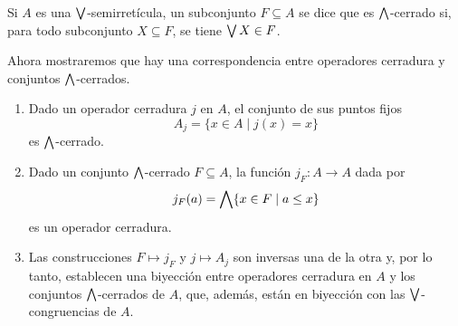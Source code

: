 \begin{definition}
    Si $A$ es una $\bigvee$-semirretícula,
    un subconjunto $F\subseteq A$ se dice que es $\bigwedge$-cerrado si,
    para todo subconjunto $X\subseteq F$, se tiene $\bigvee X\in F$.
\end{definition}

Ahora mostraremos que hay una correspondencia entre operadores
cerradura y conjuntos $\bigwedge$-cerrados.

\begin{lemma}\label{lemma:cerraduras-y-conjuntosfijos}
  \leavevmode
  \begin{enumerate}
    \item
    Dado un operador cerradura $j$ en $A$, el conjunto de sus
    puntos fijos
    \[
        A_j = \{x\in A \mid j(x) = x\}
    \]
    es $\bigwedge$-cerrado.
    \item
    Dado un conjunto $\bigwedge$-cerrado $F\subseteq A$, la función
    $j_F:A\to A$ dada por
    \[
        j_F(a) = \bigwedge\{x\in F \mid a\leq x\}
    \]
    es un operador cerradura.
    \item
    Las construcciones $F\mapsto j_F$
    y $j\mapsto A_j$ son inversas una de la otra y, por lo tanto,
    establecen una biyección entre operadores
    cerradura en $A$ y los conjuntos $\bigwedge$-cerrados de $A$, que,
    además, están en biyección con las $\bigvee$-congruencias de
    $A$.
  \end{enumerate}
\end{lemma}
